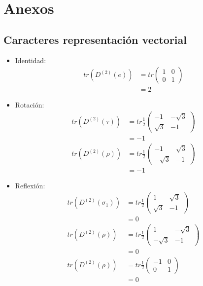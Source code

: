 \documentclass[12pt]{amsart}
\begin{document}
\section{Anexos}
\subsection{Caracteres representación vectorial}
\begin{itemize}
  \item Identidad:
    \begin{align*}
      tr(D^{(2)}(e)) &=
      tr\begin{pmatrix}
        1 & 0\\
        0 & 1
      \end{pmatrix}\\
      &= 2
    \end{align*}
  \item Rotación:
    \begin{align*}
      tr(D^{(2)}(\tau)) &=
      tr\frac{1}{2}\begin{pmatrix}
        -1 & -\sqrt{3}\\
        \sqrt{3} & -1
      \end{pmatrix}\\
      &= -1\\
      tr(D^{(2)}(\rho)) &=
      tr\frac{1}{2}\begin{pmatrix}
        -1 & \sqrt{3}\\
        -\sqrt{3} & -1
      \end{pmatrix}\\
      &= -1
    \end{align*}

  \item Reflexión:
    \begin{align*}
      tr(D^{(2)}(\sigma_1)) &=
      tr\frac{1}{2}\begin{pmatrix}
        1 & \sqrt{3}\\
        \sqrt{3} & -1
      \end{pmatrix}\\
      &= 0\\
      tr(D^{(2)}(\rho)) &=
      tr\frac{1}{2}\begin{pmatrix}
        1 & -\sqrt{3}\\
        -\sqrt{3} & -1
      \end{pmatrix}\\
      &= 0\\
      tr(D^{(2)}(\rho)) &=
      tr\frac{1}{2}\begin{pmatrix}
        -1 & 0\\
        0 & 1
      \end{pmatrix}\\
      &= 0
    \end{align*}
\end{itemize}
\end{document}
